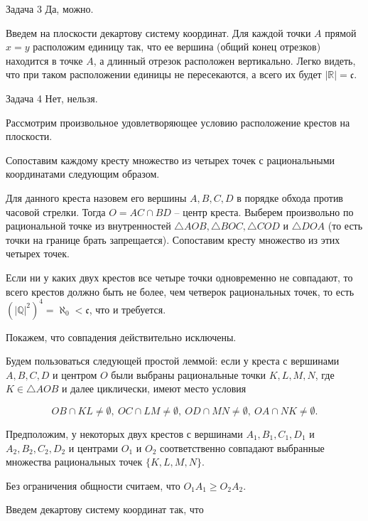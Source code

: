 \documentclass{article}
\newcommand{\abs}[1]{\left\lvert#1\right\rvert}
\newcommand{\Q}{\mathbb{Q}}
\newcommand{\R}{\mathbb{R}}
\newcommand{\continuum}{\mathfrak{c}}
\begin{document}
	\begin{section}{Задача 3}
		Да, можно.

		Введем на плоскости декартову систему координат. Для каждой точки $A$ прямой $x = y$ расположим единицу так, что ее вершина (общий конец отрезков) находится в точке $A$, а длинный отрезок расположен вертикально. Легко видеть, что при таком расположении единицы не пересекаются, а всего их будет $\abs{\R} = \continuum$.
	\end{section}

	\begin{section}{Задача 4}
		Нет, нельзя.

		Рассмотрим произвольное удовлетворяющее условию расположение крестов на плоскости.

		Сопоставим каждому кресту множество из четырех точек с рациональными координатами следующим образом.

		Для данного креста назовем его вершины $A, B, C, D$ в порядке обхода против часовой стрелки. Тогда $O = AC \cap BD$ -- центр креста. Выберем произвольно по рациональной точке из внутренностей $\triangle AOB, \triangle BOC, \triangle COD$ и $\triangle DOA$ (то есть точки на границе брать запрещается). Сопоставим кресту множество из этих четырех точек.

		Если ни у каких двух крестов все четыре точки одновременно не совпадают, то всего крестов должно быть не более, чем четверок рациональных точек, то есть $(\abs{\Q}^2)^4 = \aleph_0 < \continuum$, что и требуется.

		Покажем, что совпадения действительно исключены.

		Будем пользоваться следующей простой леммой: если у креста с вершинами $A, B, C, D$ и центром $O$ были выбраны рациональные точки $K, L, M, N$, где $K \in \triangle AOB$ и далее циклически, имеют место условия

		\begin{equation*}
			OB \cap KL \ne \emptyset, \
			OC \cap LM \ne \emptyset, \
			OD \cap MN \ne \emptyset, \
			OA \cap NK \ne \emptyset.
		\end{equation*}

		Предположим, у некоторых двух крестов с вершинами $A_1, B_1, C_1, D_1$ и $A_2, B_2, C_2, D_2$ и центрами $O_1$ и $O_2$ соответственно совпадают выбранные множества рациональных точек $\{K, L, M, N\}$.

		Без ограничения общности считаем, что $O_1 A_1 \ge O_2 A_2$.

		Введем декартову систему координат так, что


\end{section}
\end{document}
